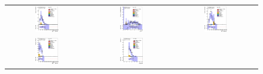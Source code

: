 \begin{figure}[h!]
\begin{center}
\begin{tabular}{ccc}
%
\includegraphics[width=0.30\textwidth]{appendices/figures/sdrs/LepPt_ELEMUONCR1_1W_NOMINAL.eps} &
\includegraphics[width=0.30\textwidth]{appendices/figures/sdrs/LepEta_ELEMUONCR1_1W_NOMINAL.eps} &
\includegraphics[width=0.30\textwidth]{appendices/figures/sdrs/MET_ELEMUONCR1_1W_NOMINAL.eps} \\
\includegraphics[width=0.30\textwidth]{appendices/figures/sdrs/Wlep_MassT_ELEMUONCR1_1W_NOMINAL.eps} &
\includegraphics[width=0.30\textwidth]{appendices/figures/sdrs/Njets25_ELEMUONCR1_1W_NOMINAL.eps}  &

\end{tabular}
\end{center}
\end{figure}
